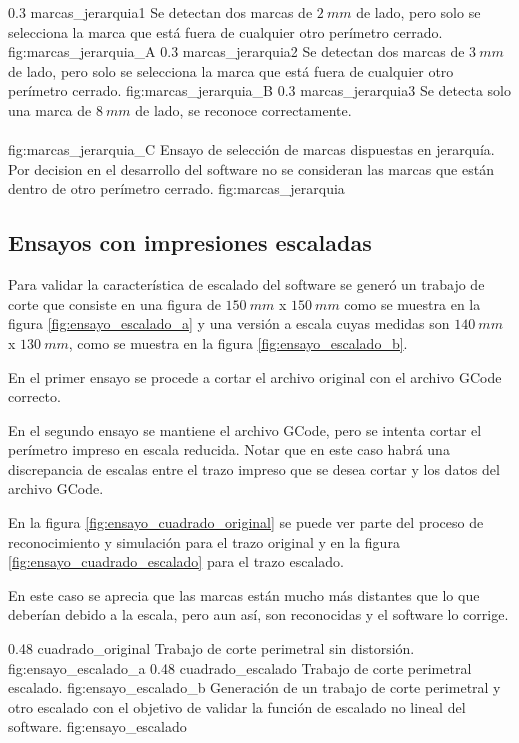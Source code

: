    \subfigabc
   {0.3} {marcas_jerarquia1} {Se detectan dos marcas de $2\:mm$ de lado, pero solo se selecciona la marca que está fuera de cualquier otro perímetro cerrado.} {fig:marcas_jerarquia_A}
   {0.3} {marcas_jerarquia2} {Se detectan dos marcas de $3\:mm$ de lado, pero solo se selecciona la marca que está fuera de cualquier otro perímetro cerrado.} {fig:marcas_jerarquia_B}
   {0.3} {marcas_jerarquia3} {Se detecta solo una marca de $8\:mm$ de lado, se reconoce correctamente.\\ \vphantom{1}\\ \vphantom{1}} {fig:marcas_jerarquia_C}
   {Ensayo de selección de marcas dispuestas en jerarquía. Por decision en el desarrollo del software no se consideran las marcas que están dentro de otro perímetro cerrado.}
   {fig:marcas_jerarquia}

\subsection{Ensayos con impresiones escaladas}

Para validar la característica de escalado del software se generó un trabajo de corte que consiste en una figura de $150\:mm$ x $150\:mm$ como se muestra en la figura \ref{fig:ensayo_escalado_a} y una versión a escala cuyas medidas son $140\:mm$ x $130\:mm$, como se muestra en la figura \ref{fig:ensayo_escalado_b}.\par
   En el primer ensayo se procede a cortar el archivo original con el archivo GCode correcto. \par
   En el segundo ensayo se mantiene el archivo GCode, pero se intenta cortar el perímetro impreso en escala reducida. Notar que en este caso habrá una discrepancia de escalas entre el trazo impreso que se desea cortar y los datos del archivo GCode.\par
   En la figura \ref{fig:ensayo_cuadrado_original} se puede ver parte del proceso de reconocimiento y simulación para el trazo original y en la figura \ref{fig:ensayo_cuadrado_escalado} para el trazo escalado.\par
   En este caso se aprecia que las marcas están mucho más distantes que lo que deberían debido a la escala, pero aun así, son reconocidas y el software lo corrige.

   \subfigab
   {0.48} {cuadrado_original} {Trabajo de corte perimetral sin distorsión.} {fig:ensayo_escalado_a}
   {0.48} {cuadrado_escalado} {Trabajo de corte perimetral escalado.} {fig:ensayo_escalado_b}
   {Generación de un trabajo de corte perimetral y otro escalado con el objetivo de validar la función de escalado no lineal del software. }
   {fig:ensayo_escalado}

